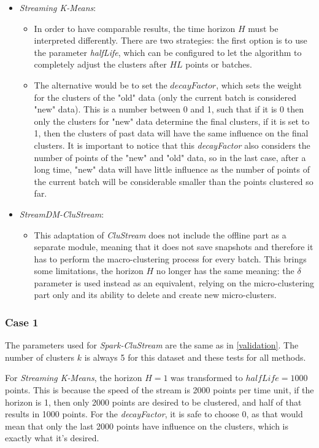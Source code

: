 \begin{itemize}
 \item \textit{Streaming K-Means}:
 \begin{itemize}
  \item In order to have comparable results, the time horizon $H$ must be interpreted differently. There are two strategies: the first option is to use the parameter \textit{halfLife}, which can be configured to let the algorithm to completely adjust the clusters after $HL$ points or batches.
  \item The alternative would be to set the $decayFactor$, which sets the weight for the clusters of the "old" data (only the current batch is considered "new" data). This is a number between 0 and 1, such that if it is 0 then only the clusters for "new" data determine the final clusters, if it is set to 1, then the clusters of past data will have the same influence on the final clusters. It is important to notice that this \textit{decayFactor} also considers the number of points of the "new" and "old" data, so in the last case, after a long time, "new" data will have little influence as the number of points of the current batch will be considerable smaller than the points clustered so far.
 \end{itemize}
 \item \textit{StreamDM-CluStream}:
 \begin{itemize}
  \item This adaptation of \textit{CluStream} does not include the offline part as a separate module, meaning that it does not save snapshots and therefore it has to perform the macro-clustering process for every batch. This brings some limitations, the horizon $H$ no longer has the same meaning: the $\delta$ parameter is used instead as an equivalent, relying on the micro-clustering part only and its ability to delete and create new micro-clusters.
\end{itemize}

\end{itemize}

\subsubsection{Case 1}

The parameters used for \textit{Spark-CluStream} are the same as in \ref{validation}. The number of clusters $k$ is always 5 for this dataset and these tests for all methods.

For \textit{Streaming K-Means}, the horizon $H=1$ was transformed to $halfLife=1000$ points. This is because the speed of the stream is 2000 points per time unit, if the horizon is 1, then only 2000 points are desired to be clustered, and half of that results in 1000 points. For the \textit{decayFactor}, it is safe to choose 0, as that would mean that only the last 2000 points have influence on the clusters, which is exactly what it's desired.

